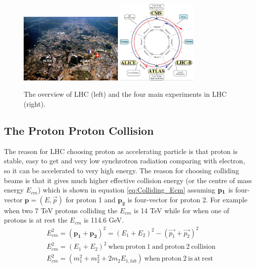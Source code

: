 \begin{figure}[h!]
\begin{center}
\includegraphics[width=0.45\textwidth]{figures/LHC/LHC.jpeg}
\includegraphics[width=0.35\textwidth]{figures/LHC/LHC2.jpg}
\caption{The overview of LHC (left) and the four main experiments in LHC (right).}
\label{fig:LHC}
\end{center}
\end{figure}

\subsection{The Proton Proton Collision}\label{sec:LHC_pp_collision}
The reason for LHC choosing proton as accelerating particle is that proton is stable, easy to get and very low synchrotron radiation comparing with electron, so it can be accelerated to very high energy. The reason for choosing colliding beams is that it gives much higher effective collision energy (or the centre of mass energy $E_{cm}$) which is shown in equation \ref{eq:Colliding_Ecm} assuming $\bf{p_{1}}$ is four-vector $\mathbf{p}=(E,\overrightarrow{p})$ for proton 1 and $\mathbf{p_{2}}$ is four-vector for proton 2. For example when two 7 TeV protons colliding the $E_{cm}$ is 14 TeV while for when one of protons is at rest the $E_{cm}$ is 114.6 GeV.
\begin{equation}
\begin{split}
&E_{cm}^{2}=(\mathbf{p_{1}}+\mathbf{p_{2}})^{2}=(E_{1}+E_{2})^{2}-(\overrightarrow{p_{1}}+\overrightarrow{p_{2}})^{2} \\
&E_{cm}^{2}=(E_{1}+E_{2})^{2} \mathrm{~when~proton~1~and~proton~2~collision}                                  \\
&E_{cm}^{2}=(m_{1}^{2}+m_{2}^{2}+2m_{2}E_{1,lab}) \mathrm{~when~proton~2~is~at~rest}                          \\
\end{split}
\label{eq:Colliding_Ecm}
\end{equation}

